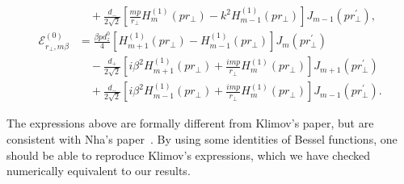 \begin{align}
&\quad+ \frac{d_-}{2\sqrt{2}}\left[\frac{mp}{r\!_\perp}H^{(1)}_m\!\left( pr_\perp \right)-k^2 H^{(1)}_{m-1}\!\left( pr_\perp \right) \right] J_{m-1}\!\left( {pr\!_\perp^{\prime} }\right),\\
\mathcal{E}_{r\!_\perp,m\beta}^{(0)} 
&= \frac{\beta pd^0_z}{4}\left[ H^{(1)}_{m+1}\!\left( pr\!_\perp \right)-H^{(1)}_{m-1}\!\left( pr_\perp \right)\right] J_m\left( {pr\!_\perp^{\prime} }\right)\nonumber\\ 
&\quad -\frac{d_+}{2\sqrt{2}}\left[ i\beta^2H^{(1)}_{m+1}\!\left( pr_\perp \right) +\frac{imp}{r\!_\perp}H^{(1)}_m\!\left( pr_\perp \right)\right] J_{m+1}\!\left( {pr\!_\perp^{\prime} }\right)\nonumber\\
&\quad + \frac{d_-}{2\sqrt{2}}\left[ i\beta^2H^{(1)}_{m-1}\!\left( pr_\perp \right) +\frac{imp}{r\!_\perp}H^{(1)}_m\!\left( pr_\perp \right)\right] J_{m-1}\!\left( {pr\!_\perp^{\prime} }\right).
\end{align}


The expressions above are formally different from Klimov's paper, but are consistent with Nha's paper~\cite{Nha1997}. By using some identities of Bessel functions, one should be able to reproduce Klimov's expressions, which we have checked numerically equivalent to our results.

